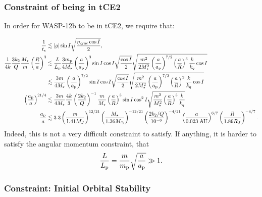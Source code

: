\documentclass[11pt,
        usenames, %
        dvipsnames %
    ]{article}
\newcommand*{\abs}[1]{\left|#1\right|}
\newcommand*{\p}[1]{\left(#1\right)}
\begin{document}
\subsubsection{Constraint of being in tCE2}

In order for WASP-12b to be in tCE2, we require that:

\begin{align}
    \frac{1}{t_{\rm s}} &\lesssim \abs{g} \sin I
        \sqrt{\frac{\eta_{\rm sync}\cos I}{2}},\\
    \frac{1}{4k}\frac{3k_2}{Q}\frac{M_\star}{m}\p{\frac{R}{a}}^3
        &\lesssim \frac{L}{L_{\rm p}}
            \frac{3m_{\rm p}}{4M_{\star}}\p{\frac{a}{a_{\rm p}}}^3
            \sin I \cos I\sqrt{\frac{\cos I}{2}}
            \sqrt{\frac{m^2}{2M_\star^2}\p{\frac{a}{a_{\rm p}}}^{7/2}
                \p{\frac{a}{R}}^3 \frac{k}{k_q}\cos I}\nonumber\\
        &\lesssim \frac{3m}{4M_{\star}}\p{\frac{a}{a_{\rm p}}}^{7/2}
            \sin I \cos I\sqrt{\frac{\cos I}{2}}
            \sqrt{\frac{m^2}{2M_\star^2}\p{\frac{a}{a_{\rm p}}}^{7/2}
                \p{\frac{a}{R}}^3 \frac{k}{k_q}\cos I}\nonumber\\
    \p{\frac{a_{\rm p}}{a}}^{21/4} &\lesssim
        \frac{3m}{4M_{\star}}
            \frac{4k}{3}\p{\frac{2k_2}{Q}}^{-1}
            \frac{m}{M_{\star}}
            \p{\frac{a}{R}}^3
            \sin I \cos^2 I
            \sqrt{\frac{m^2}{M_\star^2}
                \p{\frac{a}{R}}^3 \frac{k}{k_q}}\nonumber\\
    \frac{a_{\rm p}}{a} &\lesssim 3.3
            \p{\frac{m}{1.41 M_J}}^{12/21}
            \p{\frac{M_\star}{1.36 M_{\odot}}}^{-12/21}
            \p{\frac{2k_2/Q}{10^{-6}}}^{-4/21}
            \p{\frac{a}{0.023\;\mathrm{AU}}}^{6/7}
            \p{\frac{R}{1.89 R_J}}^{-6/7}.
\end{align}
Indeed, this is not a very difficult constraint to satisfy. If anything, it is
harder to satisfy the angular momentum constraint, that
\begin{equation}
    \frac{L}{L_{\rm p}} = \frac{m}{m_{\rm p}}\sqrt{\frac{a}{a_{\rm p}}} \gg 1.
\end{equation}

\subsubsection{Constraint: Initial Orbital Stability}
\end{document}
